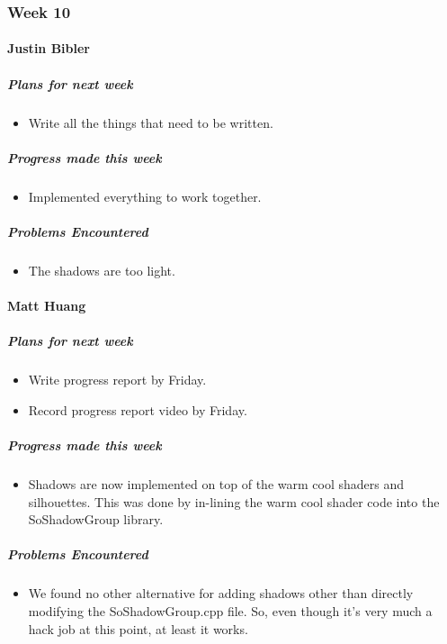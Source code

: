 {
\subsubsection{Week 10}
\paragraph{Justin Bibler}
\subparagraph{Plans for next week}
\begin{itemize}
  \item Write all the things that need to be written.
\end{itemize}

\subparagraph{Progress made this week}
\begin{itemize}
  \item Implemented everything to work together.
\end{itemize}

\subparagraph{Problems Encountered}
\begin{itemize}
  \item  The shadows are too light.
\end{itemize}
\vspace{3mm}

\paragraph{Matt Huang}
\subparagraph{Plans for next week}
\begin{itemize}
  \item Write progress report by Friday.
  \item Record progress report video by Friday.
\end{itemize}

\subparagraph{Progress made this week}
\begin{itemize}
  \item Shadows are now implemented on top of the warm cool shaders and silhouettes. This was done by in-lining the warm cool shader code into the SoShadowGroup library.
\end{itemize}

\subparagraph{Problems Encountered}
\begin{itemize}
  \item We found no other alternative for adding shadows other than directly modifying the SoShadowGroup.cpp file. So, even though it's very much a hack job at this point, at least it works.
\end{itemize}
\vspace{3mm}

}
